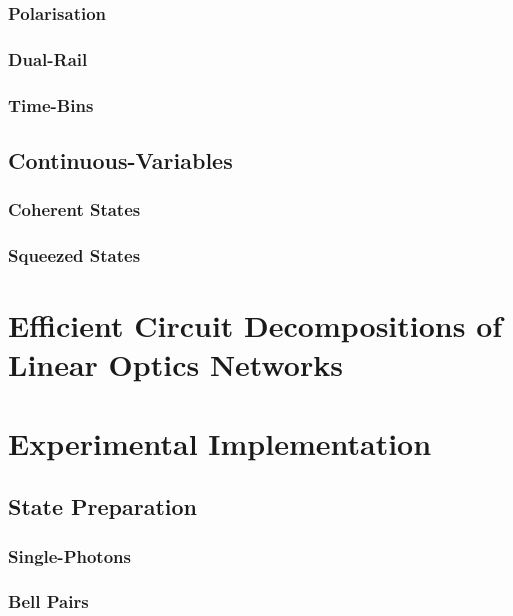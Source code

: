 \documentclass[aps,rmp,twocolumn,amsmath,amssymb,nofootinbib,superscriptaddress]{revtex4}
\newcommand{\comment}[1]{{\color{blue}{#1}}}
\begin{document}
\subsubsection{Polarisation}

\subsubsection{Dual-Rail}

\subsubsection{Time-Bins}

\subsection{Continuous-Variables}

\subsubsection{Coherent States}

\subsubsection{Squeezed States}

\section{Efficient Circuit Decompositions of Linear Optics Networks}

\comment{Discuss the Reck et al. decomposition}

\section{Experimental Implementation}

\subsection{State Preparation}

\subsubsection{Single-Photons}

\subsubsection{Bell Pairs}
\end{document}
